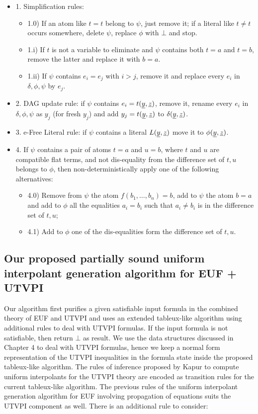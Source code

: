 \begin{itemize}
  \item[] 1. Simplification rules:
    \begin{itemize}
      \item 1.0) If an atom like $t = t$ belong to $\psi$, just remove it; if a
      literal like $t \neq t$ occurs somewhere, delete $\psi$, replace $\phi$
      with $\bot$ and stop.
    \item 1.i) If $t$ is not a variable to eliminate and $\psi$ contains
    both $t = a$ and $t = b$, remove the latter and replace it with $b = a$.
  \item 1.ii) If $\psi$ contains $e_i = e_j$ with $i > j$, remove it
  and replace every $e_i$ in $\delta, \phi, \psi$ by $e_j$.
    \end{itemize}
  \item[] 2. DAG update rule: if $\psi$ contains $e_i = t(\underline{y}, \underline{z})$, remove
    it, rename every $e_i$ in $\delta, \phi, \psi$ as $y_j$ (for fresh $y_j$)
    and add $y_j = t(\underline{y}, \underline{z})$ to $\delta(\underline{y}, \underline{z})$.
  \item[] 3.  e-Free Literal rule: if $\psi$ contains a literal $L(\underline{y}, \underline{z})$
    move it to $\phi(\underline{y}, \underline{z})$.
  \item[] 4.  If $\psi$ contains a pair of atoms $t = a$ and $u = b$, where
    $t$ and $u$ are compatible flat terms, and not dis-equality from the difference
    set of $t, u$ belongs to $\phi$, then non-deterministically apply one of the
    following alternatives:
    \begin{itemize}
      \item 4.0) Remove from $\psi$ the atom $f(b_1, \dots, b_n) = b$, add
      to $\psi$ the atom $b = a$ and add to $\phi$ all the equalities
      $a_i = b_i$ such that $a_i \neq b_i$ is in the difference set of $t, u$;
      \item 4.1) Add to $\phi$ one of the dis-equalities form the difference
      set of $t, u$.
    \end{itemize}
\end{itemize}

\subsection{Our proposed partially sound 
uniform interpolant generation algorithm 
for EUF + UTVPI}

Our algorithm first purifies a given satisfiable 
input formula in the
combined theory of EUF and UTVPI and 
uses an extended tableux-like algorithm
using additional rules to deal with UTVPI formulas. 
If the input formula is not satisfiable, 
then return $\bot$ as result. 
We use the data structures discussed 
in Chapter 4 to deal with UTVPI formulas,
hence we keep a normal form representation 
of the UTVPI inequalities in the
formula state inside the proposed 
tableux-like algorithm. The rules of 
inference proposed by Kapur to compute
uniform interpolants for the UTVPI 
theory are encoded as transition rules
for the current tableux-like algorithm.
The previous rules of the uniform interpolant 
generation algorithm
for EUF involving propagation of equations 
suits the UTVPI component as well. 
There is an additional rule to consider:

